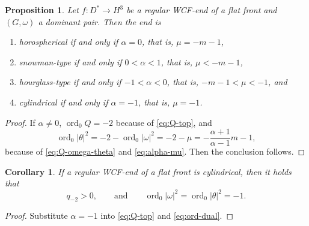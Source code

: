 \documentclass[a4paper]{amsart}
\theoremstyle{plain}
\newtheorem{proposition}[theorem]{Proposition}
\newtheorem{corollary}[theorem]{Corollary}
\theoremstyle{remark}
\numberwithin{equation}{section}
\begin{document}
\begin{proposition}\label{lem:alpha-mu}
 Let $f\colon{}D^*\to H^3$ be a regular WCF-end of a flat front
 and $(G,\omega)$ a dominant pair.
 Then the end is
 \begin{enumerate}
  \item horospherical if and only if $\alpha=0$, that is, $\mu=-m-1$,
  \item snowman-type if and only if $0<\alpha<1$, that is, $\mu<-m-1$,
  \item hourglass-type if and only if $-1<\alpha<0$, that is,
	$-m-1<\mu<-1$, and
  \item cylindrical if and only if $\alpha=-1$, that is, $\mu=-1$.
 \end{enumerate}
\end{proposition}
\begin{proof}
 If $\alpha\neq 0$, ${\operatorname{ord}}_0 Q=-2$ because of \eqref{eq:Q-top},
 and 
 \begin{equation}\label{eq:ord-dual}
    {\operatorname{ord}}_0|\theta|^2=-2-{\operatorname{ord}}_0|\omega|^2=
       -2-\mu  =-\frac{\alpha+1}{\alpha-1}m-1,
 \end{equation}
 because of \eqref{eq:Q-omega-theta} and \eqref{eq:alpha-mu}.
 Then the conclusion follows.
\end{proof}\begin{corollary}\label{cor:alpha-mu}
 If a regular WCF-end of a flat front is cylindrical, then
 it holds that
 \[
     q_{-2}>0,\qquad\text{and}\qquad
     {\operatorname{ord}}_0|\omega|^2={\operatorname{ord}}_0|\theta|^2=-1.
 \]
\end{corollary}
\begin{proof}
 Substitute $\alpha=-1$ into \eqref{eq:Q-top} and \eqref{eq:ord-dual}.
\end{proof}
\end{document}
